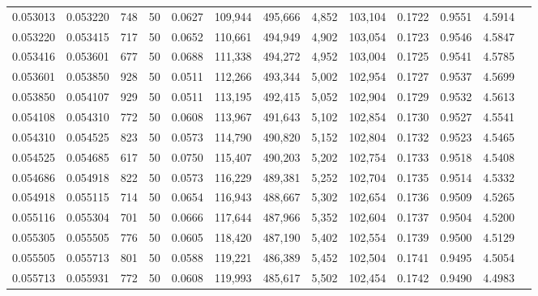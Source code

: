 \begin{tabular}{rrrrrrrrrrrrr}
0.053013 & 0.053220 &   748 &  50 &                                     0.0627 & 109,944 & 495,666 &   4,852 & 103,104 & 0.1722 & 0.9551 & 4.5914 \\
0.053220 & 0.053415 &   717 &  50 &                                     0.0652 & 110,661 & 494,949 &   4,902 & 103,054 & 0.1723 & 0.9546 & 4.5847 \\
0.053416 & 0.053601 &   677 &  50 &                                     0.0688 & 111,338 & 494,272 &   4,952 & 103,004 & 0.1725 & 0.9541 & 4.5785 \\
0.053601 & 0.053850 &   928 &  50 &                                     0.0511 & 112,266 & 493,344 &   5,002 & 102,954 & 0.1727 & 0.9537 & 4.5699 \\
0.053850 & 0.054107 &   929 &  50 &                                     0.0511 & 113,195 & 492,415 &   5,052 & 102,904 & 0.1729 & 0.9532 & 4.5613 \\
0.054108 & 0.054310 &   772 &  50 &                                     0.0608 & 113,967 & 491,643 &   5,102 & 102,854 & 0.1730 & 0.9527 & 4.5541 \\
0.054310 & 0.054525 &   823 &  50 &                                     0.0573 & 114,790 & 490,820 &   5,152 & 102,804 & 0.1732 & 0.9523 & 4.5465 \\
0.054525 & 0.054685 &   617 &  50 &                                     0.0750 & 115,407 & 490,203 &   5,202 & 102,754 & 0.1733 & 0.9518 & 4.5408 \\
0.054686 & 0.054918 &   822 &  50 &                                     0.0573 & 116,229 & 489,381 &   5,252 & 102,704 & 0.1735 & 0.9514 & 4.5332 \\
0.054918 & 0.055115 &   714 &  50 &                                     0.0654 & 116,943 & 488,667 &   5,302 & 102,654 & 0.1736 & 0.9509 & 4.5265 \\
0.055116 & 0.055304 &   701 &  50 &                                     0.0666 & 117,644 & 487,966 &   5,352 & 102,604 & 0.1737 & 0.9504 & 4.5200 \\
0.055305 & 0.055505 &   776 &  50 &                                     0.0605 & 118,420 & 487,190 &   5,402 & 102,554 & 0.1739 & 0.9500 & 4.5129 \\
0.055505 & 0.055713 &   801 &  50 &                                     0.0588 & 119,221 & 486,389 &   5,452 & 102,504 & 0.1741 & 0.9495 & 4.5054 \\
0.055713 & 0.055931 &   772 &  50 &                                     0.0608 & 119,993 & 485,617 &   5,502 & 102,454 & 0.1742 & 0.9490 & 4.4983 \\

\end{tabular}
